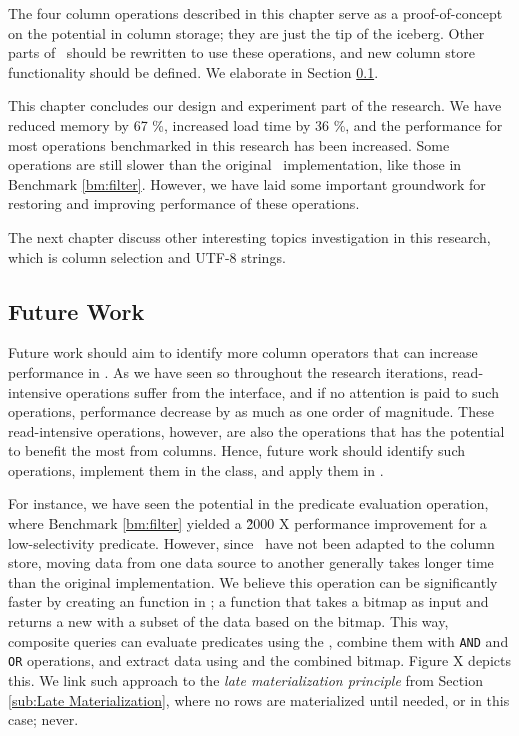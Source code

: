 The four column operations described in this chapter serve as a proof-of-concept on the potential in column storage; they are just the tip of the iceberg. Other parts of \gap~should be rewritten to use these operations, and new column store functionality should be defined. We elaborate in Section \ref{operations:future-work}.

This chapter concludes our design and experiment part of the research. We have reduced memory by 67 \%, increased load time by 36 \%, and the performance for most operations benchmarked in this research has been increased. Some operations are still slower than the original \gap~implementation, like those in Benchmark \ref{bm:filter}. However, we have laid some important groundwork for restoring and improving performance of these operations.

The next chapter discuss other interesting topics investigation in this research, which is column selection and UTF-8 strings. 

\subsection{Future Work}
\label{operations:future-work}
Future work should aim to identify more column operators that can increase performance in \gap. As we have seen so throughout the research iterations, read-intensive operations suffer from the  interface, and if no attention is paid to such operations, performance decrease by as much as one order of magnitude. These read-intensive operations, however, are also the operations that has the potential to benefit the most from columns. Hence, future work should identify such operations, implement them in the  class, and apply them in \gap. 

For instance, we have seen the potential in the predicate evaluation operation, where Benchmark \ref{bm:filter} yielded a \~2000 X performance improvement for a low-selectivity predicate. However, since \gap~have not been adapted to the column store, moving data from one data source to another generally takes longer time than the original implementation. We believe this operation can be significantly faster by creating an  function in ; a function that takes a bitmap as input and returns a new  with a subset of the data based on the bitmap. This way, composite queries can evaluate predicates using the , combine them with \texttt{AND} and \texttt{OR} operations, and extract data using  and the combined bitmap. Figure X depicts this. We link such approach to the \textit{late materialization principle} from Section \ref{sub:Late Materialization}, where no rows are materialized until needed, or in this case; never.
